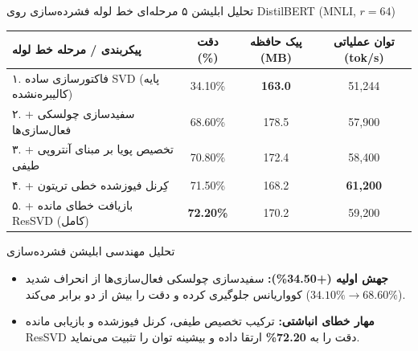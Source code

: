 \documentclass[aspectratio=169,10pt]{beamer}
\begin{document}
\begin{frame}{تحلیل ابلیشن ۵ مرحله‌ای خط لوله فشرده‌سازی روی DistilBERT (MNLI, $r=64$)}
  \begin{table}
    \centering
    \small
    \begin{tabular}{lccc}
      \toprule
      \textbf{پیکربندی / مرحله خط لوله} & \textbf{دقت (\%)} & \textbf{پیک حافظه (MB)} & \textbf{توان عملیاتی (tok/s)} \\
      \midrule
      ۱. فاکتورسازی ساده SVD (پایه کالیبره‌نشده) & 34.10\% & \textbf{163.0} & 51,244 \\
      ۲. + سفیدسازی چولسکی فعال‌سازی‌ها & 68.60\% & 178.5 & 57,900 \\
      ۳. + تخصیص پویا بر مبنای آنتروپی طیفی & 70.80\% & 172.4 & 58,400 \\
      ۴. + کِرنل فیوزشده خطی تریتون & 71.50\% & 168.2 & \textbf{61,200} \\
      ۵. + بازیافت خطای مانده ResSVD (کامل) & \textbf{72.20\%} & 170.2 & 59,200 \\
      \bottomrule
    \end{tabular}
  \end{table}

  \begin{block}{تحلیل مهندسی ابلیشن فشرده‌سازی}
    \begin{itemize}\footnotesize
      \item \textbf{جهش اولیه (+34.50\%):} سفیدسازی چولسکی فعال‌سازی‌ها از انحراف شدید کوواریانس جلوگیری کرده و دقت را بیش از دو برابر می‌کند ($34.10\% \to 68.60\%$).
      \item \textbf{مهار خطای انباشتی:} ترکیب تخصیص طیفی، کرنل فیوزشده و بازیابی مانده ResSVD دقت را به \textbf{72.20\%} ارتقا داده و بیشینه توان را تثبیت می‌نماید.
    \end{itemize}
  \end{block}
\end{frame}
\end{document}
